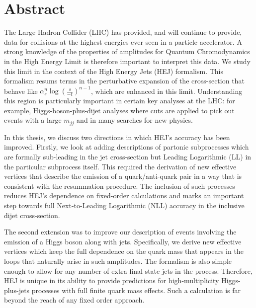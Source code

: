 \chapter{Abstract}

The Large Hadron Collider (LHC) has provided, and will continue to provide, data for collisions at the highest energies ever seen in a particle accelerator. A strong knowledge of the properties of amplitudes for Quantum Chromodynamics in the High Energy Limit is therefore important to interpret this data. We study this limit in the context of the High Energy Jets (HEJ) formalism. This formalism resums terms in the perturbative expansion of the cross-section that behave like $\alpha_s^n \log \left(\frac{s}{-t}\right)^{n-1}$, which are enhanced in this limit. Understanding this region is particularly important in certain key analyses at the LHC: for example, Higgs-boson-plus-dijet analyses where cuts are applied to pick out events with a large $m_{jj}$ and in many searches for new physics.

In this thesis, we discuss two directions in which HEJ's accuracy has been improved. Firstly, we look at adding descriptions of partonic subprocesses which are formally sub-leading in the jet cross-section but Leading Logarithmic (LL) in the particular subprocess itself. This required the derivation of new effective vertices that describe the emission of a quark/anti-quark pair in a way that is consistent with the resummation procedure. The inclusion of such processes reduces HEJ's dependence on fixed-order calculations and marks an important step towards full Next-to-Leading Logarithmic (NLL) accuracy in the inclusive dijet cross-section. 

The second extension was to improve our description of events involving the emission of a Higgs boson along with jets. Specifically, we derive new effective vertices which keep the full dependence on the quark mass that appears in the loops that naturally arise in such amplitudes. The formalism is also simple enough to allow for any number of extra final state jets in the process. Therefore, HEJ is unique in its ability to provide predictions for high-multiplicity Higgs-plus-jets processes with full finite quark mass effects. Such a calculation is far beyond the reach of any fixed order approach. 


